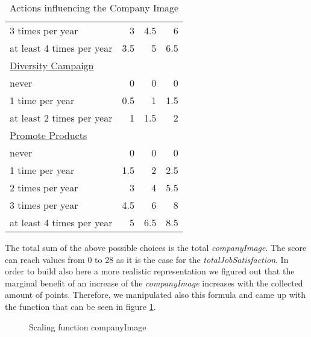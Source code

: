 \begin{table}[]
\begin{tabular}{|l|r|r|r|}
3 times per year                  & 3    & 4.5    & 6 \\
at least 4 times per year         & 3.5  & 5      & 6.5  \\
\underline{Diversity Campaign}    & & & \\
never                             & 0    & 0      & 0 \\
1 time per year                   & 0.5  & 1      & 1.5  \\
at least 2 times per year         & 1    & 1.5    & 2 \\
\underline{Promote Products} & & & \\
never                             & 0    & 0      & 0 \\
1 time per year                   & 1.5  & 2      & 2.5  \\
2 times per year                  & 3    & 4      & 5.5  \\
3 times per year                  & 4.5  & 6      & 8 \\
at least 4 times per year         & 5    & 6.5    & 8.5  \\
\hline
\end{tabular}
\caption{Actions influencing the Company Image}
\label{calculation_CI}
\end{table}

The total sum of the above possible choices is the total \textit{companyImage}. The score can reach values from 0 to 28 as it is the case for the \textit{totalJobSatisfaction}. In order to build also here a more realistic representation we figured out that the marginal benefit of an increase of the \textit{companyImage} increases with the collected amount of points. Therefore, we manipulated also this formula and came up with the function that can be seen in figure \ref{fig:scaling}.

\begin{figure}[h]
    \centering
    \caption{Scaling function companyImage}
    \label{fig:scaling}
\end{figure}

